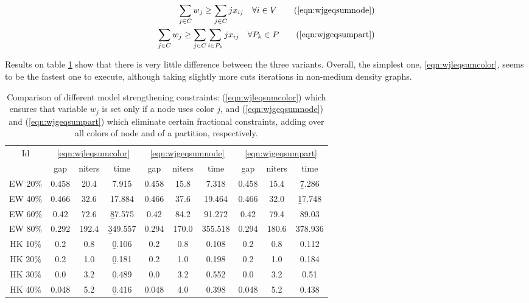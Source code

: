 \begin{align*}
\sum_{j \in C} w_j \geq \sum_{j \in C} j x_{ij} \quad \forall i \in V \tag{\ref{eqn:wjgeqsumnode}} \\
\sum_{j \in C} w_j \geq \sum_{j \in C} \sum_{i \in P_k} j x_{ij} \quad \forall P_k \in P \tag{\ref{eqn:wjgeqsumpart}}
\end{align*}

Results on table \ref{table:models:colorbound} show that there is very little difference between the three variants. Overall, the simplest one, \ref{eqn:wjleqsumcolor}, seems to be the fastest one to execute, although taking slightly more cuts iterations in non-medium density graphs.

\begin{table}
\label{table:models:colorbound}
\centering

\begin{tabular}{|c|ccc|ccc|ccc|}
\hline
\multicolumn{1}{|c|}{Id} & \multicolumn{3}{|c|}{\ref{eqn:wjleqsumcolor}} & \multicolumn{3}{|c|}{\ref{eqn:wjgeqsumnode}} & \multicolumn{3}{|c|}{\ref{eqn:wjgeqsumpart}}
\\
 & gap & niters & time & gap & niters & time & gap & niters & time
\\
\hline
EW 20\% & 0.458 & 20.4 & 7.915 & 0.458 & 15.8 & 7.318 & 0.458 & 15.4 & \b{7.286}
\\
EW 40\% & 0.466 & 32.6 & 17.884 & 0.466 & 37.6 & 19.464 & 0.466 & 32.0 & \b{17.748}
\\
EW 60\% & 0.42 & 72.6 & \b{87.575} & 0.42 & 84.2 & 91.272 & 0.42 & 79.4 & 89.03
\\
EW 80\% & 0.292 & 192.4 & \b{349.557} & 0.294 & 170.0 & 355.518 & 0.294 & 180.6 & 378.936
\\
\hline
HK 10\% &  0.2 &  0.8 & \b{0.106} &  0.2 &  0.8 & 0.108 &  0.2 &  0.8 & 0.112
\\
HK 20\% &  0.2 &  1.0 & \b{0.181} &  0.2 &  1.0 & 0.198 &  0.2 &  1.0 & 0.184
\\
HK 30\% &  0.0 &  3.2 & \b{0.489} &  0.0 &  3.2 & 0.552 &  0.0 &  3.2 & 0.51
\\
HK 40\% & 0.048 &  5.2 & \b{0.416} & 0.048 &  4.0 & 0.398 & 0.048 &  5.2 & 0.438
\\
\hline 
 \end{tabular}

\caption{Comparison of different model strengthening constraints: (\ref{eqn:wjleqsumcolor}) which ensures that variable $w_j$ is set only if a node uses color $j$, and (\ref{eqn:wjgeqsumnode}) and (\ref{eqn:wjgeqsumpart}) which eliminate certain fractional constraints, adding over all colors of node and of a partition, respectively.}

\end{table}


